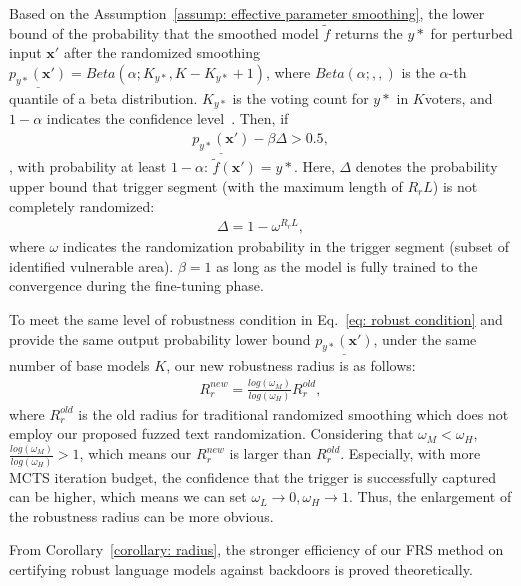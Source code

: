\begin{theorem}
Based on the Assumption~\ref{assump: effective parameter smoothing}, the lower bound of the probability that the smoothed model $\tilde{f}$ returns the $y*$ for perturbed input $\mathbf{x}'$ after the randomized smoothing $\underline{p_{y*}(\mathbf{x}')} = Beta(\alpha; K_{y*}, K - K_{y*} + 1)$, where $Beta(\alpha;,,)$ is the $\alpha$-th quantile of a beta distribution. $K_{y*}$ is the voting count for $y*$ in $K $voters, and $1-\alpha$ indicates the confidence level~\citep{zengcertified}. Then, if
\begin{equation}
\begin{aligned}
\underline{p_{y*}(\mathbf{x}')} - \beta \Delta > 0.5,
\end{aligned}
\label{eq: robust condition}
\end{equation} 
, with probability at least $1-\alpha$: $\tilde{f}(\mathbf{x}') = y*$. Here, $\Delta$ denotes the probability upper bound that trigger segment (with the maximum length of $R_r L$) is not completely randomized:
\begin{equation}
\begin{aligned}
\Delta = 1 - \omega^{R_r L},
\end{aligned}
\label{eq: delta}
\end{equation} 
where $\omega$ indicates the randomization probability in the trigger segment (subset of identified vulnerable area). $\beta=1$ as long as the model is fully trained to the convergence during the fine-tuning phase.
\end{theorem}

\begin{corollary}
\label{corollary: radius}
To meet the same level of robustness condition in Eq.~\ref{eq: robust condition} and provide the same output probability lower bound $\underline{p_{y*}(\mathbf{x}')}$, under the same number of base models $K$, our new robustness radius is as follows:
\begin{equation}
\begin{aligned}
R_r^{new} = \frac{log(\omega_M)}{log(\omega_H)} R_r^{old},
\end{aligned}
\label{eq: robustness radius}
\end{equation}  
where $R_r^{old}$ is the old radius for traditional randomized smoothing which does not employ our proposed fuzzed text randomization. Considering that $\omega_M < \omega_H$, $\frac{log(\omega_M)}{log(\omega_H)} > 1$, which means our $R_r^{new}$ is larger than $R_r^{old}$. Especially, with more MCTS iteration budget, the confidence that the trigger is successfully captured can be higher, which means we can set $\omega_L \to 0, \omega_H \to 1$. Thus, the enlargement of the robustness radius can be more obvious.
\end{corollary}
From Corollary~\ref{corollary: radius}, the stronger efficiency of our FRS method on certifying robust language models against backdoors is proved theoretically.    

